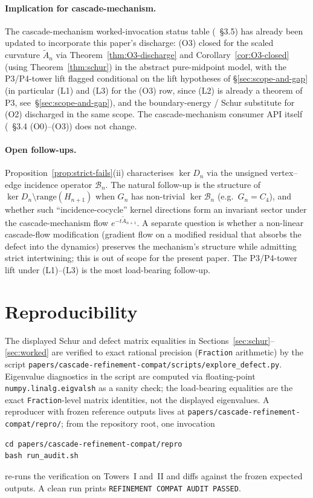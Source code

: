 \documentclass[11pt]{article}
\theoremstyle{plain}
\theoremstyle{definition}
\theoremstyle{remark}
\begin{document}
\paragraph*{Implication for cascade-mechanism.}
The cascade-mechanism worked-invocation status table
(\cite{CascadeMechanism}~\S3.5) has already been updated to
incorporate this paper's discharge: (O3) closed for the scaled
curvature $\widetilde A_n$ via Theorem~\ref{thm:O3-discharge} and
Corollary~\ref{cor:O3-closed} (using Theorem~\ref{thm:schur}) in
the abstract pure-midpoint model, with the P3/P4-tower lift
flagged conditional on the lift hypotheses of
\S\ref{sec:scope-and-gap} (in particular \textup{(L1)} and
\textup{(L3)} for the (O3) row, since \textup{(L2)} is already a
theorem of P3, see~\S\ref{sec:scope-and-gap}), and the
boundary-energy / Schur substitute for (O2) discharged in the same
scope. The
cascade-mechanism consumer API itself
(\cite{CascadeMechanism}~\S3.4 (O0)--(O3)) does not change.

\paragraph*{Open follow-ups.}
Proposition~\ref{prop:strict-fails}(ii) characterises $\ker D_n$ via
the unsigned vertex--edge incidence operator $\mathcal{B}_n$. The natural
follow-up is the structure of $\ker D_n \setminus \mathrm{range}(H_{n+1})$
when $G_n$ has non-trivial $\ker \mathcal{B}_n$ (e.g.\ $G_n = C_4$), and
whether such ``incidence-cocycle'' kernel directions form an
invariant sector under the cascade-mechanism flow
$e^{-t \widetilde A_{n+1}}$. A separate question is
whether a non-linear cascade-flow modification (gradient flow on a
modified residual that absorbs the defect into the dynamics)
preserves the mechanism's structure while admitting strict
intertwining; this is out of scope for the present paper. The
P3/P4-tower lift under \textup{(L1)}--\textup{(L3)} is the most
load-bearing follow-up.

\section{Reproducibility}\label{sec:repro}

The displayed Schur and defect matrix equalities in
Sections~\ref{sec:schur}--\ref{sec:worked} are verified to exact rational
precision (\texttt{Fraction} arithmetic) by the script
\texttt{papers/cascade-refinement-compat/scripts/explore\_defect.py}.
Eigenvalue diagnostics in the script are computed via
floating-point \texttt{numpy.linalg.eigvalsh} as a sanity check; the
load-bearing equalities are the exact \texttt{Fraction}-level
matrix identities, not the displayed eigenvalues.
A reproducer with frozen reference outputs lives at
\texttt{papers/cascade-refinement-compat/repro/}; from the
repository root, one invocation
\begin{verbatim}
cd papers/cascade-refinement-compat/repro
bash run_audit.sh
\end{verbatim}
re-runs the verification on Towers~I and~II and diffs against the
frozen expected outputs. A clean run prints
\texttt{REFINEMENT COMPAT AUDIT PASSED}.



\end{document}
